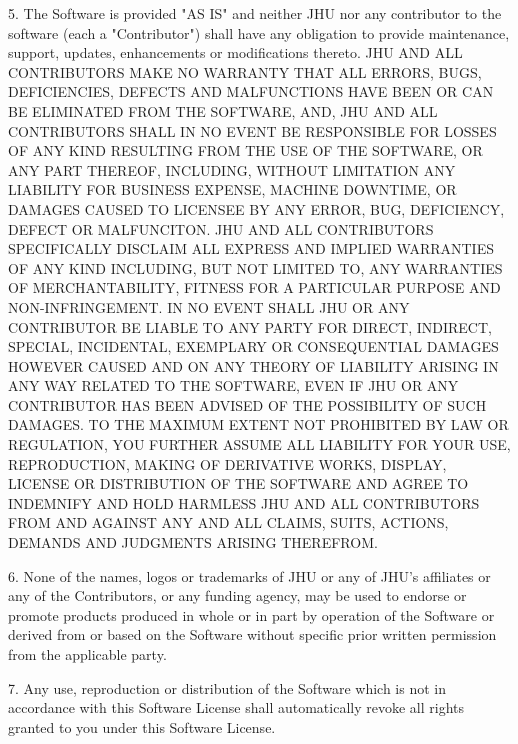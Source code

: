 \begin{DoxyPre}5. The Software is provided "AS IS" and neither JHU nor any
   contributor to the software (each a "Contributor") shall have any
   obligation to provide maintenance, support, updates, enhancements
   or modifications thereto. JHU AND ALL CONTRIBUTORS MAKE NO WARRANTY
   THAT ALL ERRORS, BUGS, DEFICIENCIES, DEFECTS AND MALFUNCTIONS HAVE
   BEEN OR CAN BE ELIMINATED FROM THE SOFTWARE, AND, JHU AND ALL
   CONTRIBUTORS SHALL IN NO EVENT BE RESPONSIBLE FOR LOSSES OF ANY
   KIND RESULTING FROM THE USE OF THE SOFTWARE, OR ANY PART THEREOF,
   INCLUDING, WITHOUT LIMITATION ANY LIABILITY FOR BUSINESS EXPENSE,
   MACHINE DOWNTIME, OR DAMAGES CAUSED TO LICENSEE BY ANY ERROR, BUG,
   DEFICIENCY, DEFECT OR MALFUNCITON.  JHU AND ALL CONTRIBUTORS
   SPECIFICALLY DISCLAIM ALL EXPRESS AND IMPLIED WARRANTIES OF ANY
   KIND INCLUDING, BUT NOT LIMITED TO, ANY WARRANTIES OF
   MERCHANTABILITY, FITNESS FOR A PARTICULAR PURPOSE AND
   NON-INFRINGEMENT. IN NO EVENT SHALL JHU OR ANY CONTRIBUTOR BE
   LIABLE TO ANY PARTY FOR DIRECT, INDIRECT, SPECIAL, INCIDENTAL,
   EXEMPLARY OR CONSEQUENTIAL DAMAGES HOWEVER CAUSED AND ON ANY THEORY
   OF LIABILITY ARISING IN ANY WAY RELATED TO THE SOFTWARE, EVEN IF
   JHU OR ANY CONTRIBUTOR HAS BEEN ADVISED OF THE POSSIBILITY OF SUCH
   DAMAGES. TO THE MAXIMUM EXTENT NOT PROHIBITED BY LAW OR REGULATION,
   YOU FURTHER ASSUME ALL LIABILITY FOR YOUR USE, REPRODUCTION, MAKING
   OF DERIVATIVE WORKS, DISPLAY, LICENSE OR DISTRIBUTION OF THE
   SOFTWARE AND AGREE TO INDEMNIFY AND HOLD HARMLESS JHU AND ALL
   CONTRIBUTORS FROM AND AGAINST ANY AND ALL CLAIMS, SUITS, ACTIONS,
   DEMANDS AND JUDGMENTS ARISING THEREFROM.\end{DoxyPre}



\begin{DoxyPre}6. None of the names, logos or trademarks of JHU or any of JHU's
   affiliates or any of the Contributors, or any funding agency, may
   be used to endorse or promote products produced in whole or in part
   by operation of the Software or derived from or based on the
   Software without specific prior written permission from the
   applicable party.\end{DoxyPre}



\begin{DoxyPre}7. Any use, reproduction or distribution of the Software which is not
   in accordance with this Software License shall automatically revoke
   all rights granted to you under this Software License.\end{DoxyPre}



